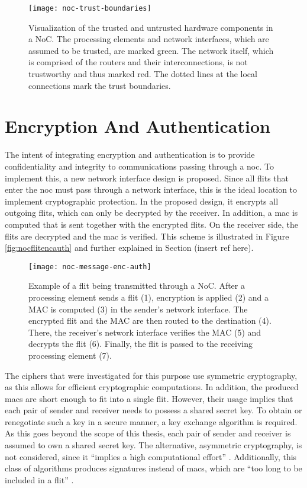 \begin{figure}
    \centering
    \texttt{[image: noc-trust-boundaries]}
    \caption[Trust boundaries in a NoC]{Visualization of the trusted and untrusted hardware components in a NoC. The processing elements and network
    interfaces, which are assumed to be trusted, are marked green. The network itself, which is comprised of the routers and their interconnections,
    is not trustworthy and thus marked red. The dotted lines at the local connections mark the trust boundaries.}
    \label{fig:noctrustboundaries}
\end{figure}

\section{Encryption And Authentication}
The intent of integrating encryption and authentication is to provide confidentiality and integrity to communications passing through a \gls{noc}. To
implement this, a new network interface design is proposed. Since all flits that enter the \gls{noc} must pass through a network interface, this is the
ideal location to implement cryptographic protection. In the proposed design, it encrypts all outgoing flits, which can only be decrypted by the
receiver. In addition, a \gls{mac} is computed that is sent together with the encrypted flits. On the receiver side, the flits are decrypted and the
\gls{mac} is verified. This scheme is illustrated in Figure \vref{fig:nocflitencauth} and further explained in Section (insert ref here).

\begin{figure}
    \centering
    \texttt{[image: noc-message-enc-auth]}
    \caption[Flit through NoC with encryption and authentication]{Example of a flit being transmitted through a NoC. After a processing element sends a flit (1),
    encryption is applied (2) and a MAC is computed (3) in the sender's network interface. The encrypted flit and the MAC are then routed to the
    destination (4). There, the receiver's network interface verifies the MAC (5) and decrypts the flit (6). Finally, the flit is passed to the
    receiving processing element (7).} %
    \label{fig:nocflitencauth}
\end{figure}

The ciphers that were investigated for this purpose use symmetric cryptography, as this allows for efficient cryptographic computations.
In addition, the produced \glspl{mac} are short enough to fit into a single flit. However, their usage implies that each pair of
sender and receiver needs to possess a shared secret key. To obtain or renegotiate such a key in a secure manner, a key exchange algorithm is required.
As this goes beyond the scope of this thesis, each pair of sender and receiver is assumed to own a shared secret key. The alternative, asymmetric
cryptography, is not considered, since it \enquote{implies a high computational effort} \cite[3]{moriam18activeattackers}. Additionally, this class of
algorithms produces signatures instead of \glspl{mac}, which are \enquote{too long to be included in a flit} \cite[3]{moriam18activeattackers}.

